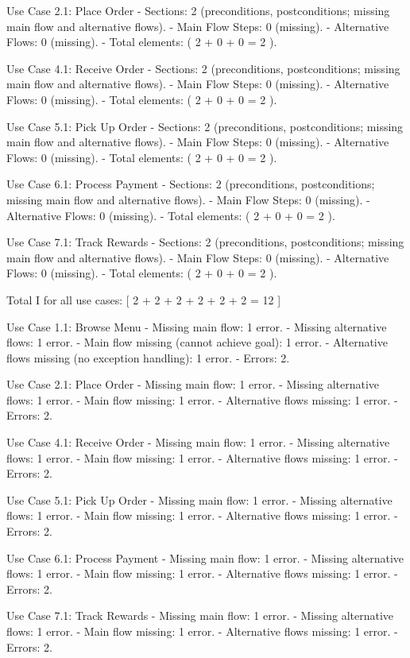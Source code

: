 Use Case 2.1: Place Order
- Sections: 2 (preconditions, postconditions; missing main flow and alternative flows).
- Main Flow Steps: 0 (missing).
- Alternative Flows: 0 (missing).
- Total elements: ( 2 + 0 + 0 = 2 ).

Use Case 4.1: Receive Order
- Sections: 2 (preconditions, postconditions; missing main flow and alternative flows).
- Main Flow Steps: 0 (missing).
- Alternative Flows: 0 (missing).
- Total elements: ( 2 + 0 + 0 = 2 ).

Use Case 5.1: Pick Up Order
- Sections: 2 (preconditions, postconditions; missing main flow and alternative flows).
- Main Flow Steps: 0 (missing).
- Alternative Flows: 0 (missing).
- Total elements: ( 2 + 0 + 0 = 2 ).

Use Case 6.1: Process Payment
- Sections: 2 (preconditions, postconditions; missing main flow and alternative flows).
- Main Flow Steps: 0 (missing).
- Alternative Flows: 0 (missing).
- Total elements: ( 2 + 0 + 0 = 2 ).

Use Case 7.1: Track Rewards
- Sections: 2 (preconditions, postconditions; missing main flow and alternative flows).
- Main Flow Steps: 0 (missing).
- Alternative Flows: 0 (missing).
- Total elements: ( 2 + 0 + 0 = 2 ).

Total I for all use cases:
[
2 + 2 + 2 + 2 + 2 + 2 = 12
]

Use Case 1.1: Browse Menu
- Missing main flow: 1 error.
- Missing alternative flows: 1 error.
- Main flow missing (cannot achieve goal): 1 error.
- Alternative flows missing (no exception handling): 1 error.
- Errors: 2.

Use Case 2.1: Place Order
- Missing main flow: 1 error.
- Missing alternative flows: 1 error.
- Main flow missing: 1 error.
- Alternative flows missing: 1 error.
- Errors: 2.

Use Case 4.1: Receive Order
- Missing main flow: 1 error.
- Missing alternative flows: 1 error.
- Main flow missing: 1 error.
- Alternative flows missing: 1 error.
- Errors: 2.

Use Case 5.1: Pick Up Order
- Missing main flow: 1 error.
- Missing alternative flows: 1 error.
- Main flow missing: 1 error.
- Alternative flows missing: 1 error.
- Errors: 2.

Use Case 6.1: Process Payment
- Missing main flow: 1 error.
- Missing alternative flows: 1 error.
- Main flow missing: 1 error.
- Alternative flows missing: 1 error.
- Errors: 2.

Use Case 7.1: Track Rewards
- Missing main flow: 1 error.
- Missing alternative flows: 1 error.
- Main flow missing: 1 error.
- Alternative flows missing: 1 error.
- Errors: 2.

